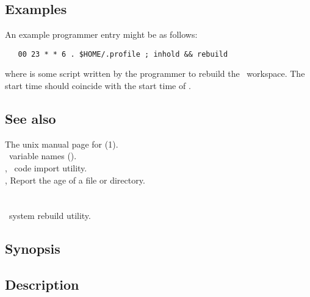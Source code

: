 \subsection*{Examples}
 
An example programmer  entry might be as follows:

\begin{verbatim}
   00 23 * * 6 . $HOME/.profile ; inhold && rebuild
\end{verbatim}

\noindent
where  is some script written by the programmer to rebuild the
\aipspp\ workspace.  The  start time should coincide with the
start time of .

 
\subsection*{See also}
 
The unix manual page for (1).\\
\aipspp\ variable names ().\\
, \aipspp\ code import utility.\\
, Report the age of a file or directory.


\newpage
\section{}
\label{sneeze}

\aipspp\ system rebuild utility.

\subsection*{Synopsis}

\begin{synopsis}
\end{synopsis}

\subsection*{Description}


